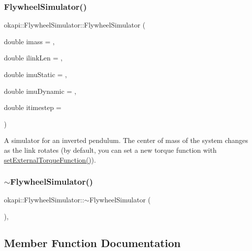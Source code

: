 \subsubsection{\texorpdfstring{FlywheelSimulator()}{FlywheelSimulator()}}
{\footnotesize\ttfamily okapi\+::\+Flywheel\+Simulator\+::\+Flywheel\+Simulator (\begin{DoxyParamCaption}\item[{double}]{imass = {},  }\item[{double}]{ilink\+Len = {},  }\item[{double}]{imu\+Static = {},  }\item[{double}]{imu\+Dynamic = {},  }\item[{double}]{itimestep = {} }\end{DoxyParamCaption})\hspace{0.3cm}{\ttfamily [explicit]}}

A simulator for an inverted pendulum. The center of mass of the system changes as the link rotates (by default, you can set a new torque function with \mbox{\hyperlink{classokapi_1_1FlywheelSimulator_a288c47223f4e558c0081c91db1180430}{set\+External\+Torque\+Function()}}). \mbox{\label{classokapi_1_1FlywheelSimulator_a915315e7bb395844e41d0bc9ae86409a}} 
\subsubsection{\texorpdfstring{$\sim$FlywheelSimulator()}{~FlywheelSimulator()}}
{\footnotesize\ttfamily okapi\+::\+Flywheel\+Simulator\+::$\sim$\+Flywheel\+Simulator (\begin{DoxyParamCaption}{ }\end{DoxyParamCaption})\hspace{0.3cm}{\ttfamily [virtual]}, {\ttfamily [default]}}



\subsection{Member Function Documentation}
\mbox{\label{classokapi_1_1FlywheelSimulator_af7ce5da6fcafa314cb2372d6e6a98e28}} 
